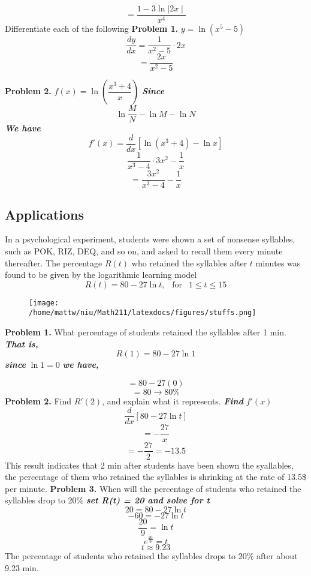 \documentclass{report}
\begin{document}
$$ = \dfrac{1 - 3\ln{\mid 2x\mid}}{x^4}$$
\bigbreak \noindent
{}
\q
Differentiate each of the following 
\bigbreak \noindent
\textbf{Problem 1.} $ y= \ln{(x^5 - 5)}$
$$ \frac{dy}{dx} = \dfrac{1}{x^2 -5} \cdot 2x$$
$$ = \dfrac{2x}{x^2 -5} $$

\pagebreak
\noindent\textbf{Problem 2.} $f(x) = \ln{\left(\dfrac{x^3 + 4}{x}\right)}$
\bigbreak \noindent
\textit{\textbf{Since}}
$$\ln{\dfrac{M}{N} - \ln{M} - \ln{N}}$$ 
\textit{\textbf{We have}}
$$ f'(x) = \frac{d}{dx}\left[\ln{\left(x^3 + 4 \right)}- \ln{x}\right]$$
$$ \dfrac{1}{x^3 - 4} \cdot 3x^2 - \dfrac{1}{x}$$
$$ = \dfrac{3x^2}{x^3 -4} - \dfrac{1}{x}$$
\bigbreak \noindent
\subsection*{Applications}
In a psychological experiment, students were shown a set of nonsense syllables, such as POK, RIZ, DEQ, and so on, and asked to recall them every minute thereafter. The percentage $R(t)$ who retained the syllables after $t$ minutes was found to be given by the logarithmic learning model
\bigbreak \noindent
$$R(t) = 80 - 27\ln{t}, \ \ \text{ for } \ \ 1 \le t \le 15$$
\begin{figure}[ht]
\centering
\texttt{[image:  /home/mattw/niu/Math211/latexdocs/figures/stuffs.png]}
\end{figure}
\bigbreak \noindent
\textbf{Problem 1.} What percentage of students retained the syllables after 1 min.
\bigbreak \noindent
\textit{\textbf{That is,}}
$$ R(1) = 80 - 27\ln{1}$$
\textit{\textbf{since}} $\ln{1} = 0$
\bigbreak \noindent
\textit{\textbf{we have,}}

$$ = 80 - 27(0)$$
$$ = 80 \rightarrow 80\%$$
\bigbreak \noindent
\textbf{Problem 2.} Find $R'(2)$, and explain what it represents.
\bigbreak \noindent
\textit{\textbf{Find}} $f'(x)$
$$ \frac{d}{dx}\left[80 - 27\ln{t}\right]$$
$$ = -\dfrac{27}{x}$$
$$ = -\dfrac{27}{2} = -13.5$$
This result indicates that 2 min after students have been shown the syallables, the percentage of them who retained the syllables is shrinking at the rate of 13.5\$ per minute.
\bigbreak \noindent
\textbf{Problem 3.} When will the percentage of students who retained the syllables drop to 20\%
\bigbreak \noindent
\textit{\textbf{set R(t) = 20 and solve for t}}
$$ 20 = 80 - 27\ln{t}$$
$$ -60 = -27\ln{t}$$
$$\dfrac{20}{9} = \ln{t}$$ 
$$ e^{\frac{20}{9}} = t$$
$$ t \approx 9.23$$
The percentage of students who retained the syllables drops to 20\% after about 9.23 min.
\bigbreak \noindent
\end{document}
